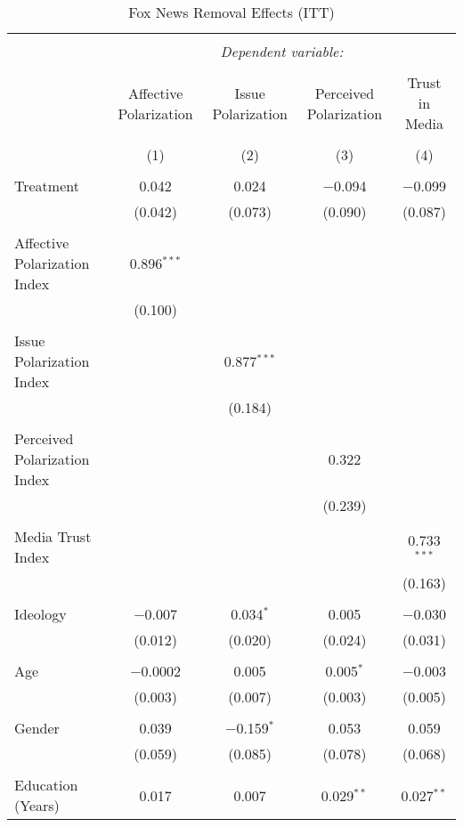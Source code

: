 
\begin{table}[!htbp] \centering 
  \caption{Fox News Removal Effects (ITT)} 
  \label{} 
\tiny 
\begin{tabular}{@{\extracolsep{5pt}}lcccc} 
\\[-1.8ex]\hline 
\hline \\[-1.8ex] 
 & \multicolumn{4}{c}{\textit{Dependent variable:}} \\ 
\cline{2-5} 
\\[-1.8ex] & Affective Polarization & Issue Polarization & Perceived Polarization & Trust in Media \\ 
\\[-1.8ex] & (1) & (2) & (3) & (4)\\ 
\hline \\[-1.8ex] 
 Treatment & 0.042 & 0.024 & $-$0.094 & $-$0.099 \\ 
  & (0.042) & (0.073) & (0.090) & (0.087) \\ 
  & & & & \\ 
 Affective Polarization Index & 0.896$^{***}$ &  &  &  \\ 
  & (0.100) &  &  &  \\ 
  & & & & \\ 
 Issue Polarization Index &  & 0.877$^{***}$ &  &  \\ 
  &  & (0.184) &  &  \\ 
  & & & & \\ 
 Perceived Polarization Index &  &  & 0.322 &  \\ 
  &  &  & (0.239) &  \\ 
  & & & & \\ 
 Media Trust Index &  &  &  & 0.733$^{***}$ \\ 
  &  &  &  & (0.163) \\ 
  & & & & \\ 
 Ideology & $-$0.007 & 0.034$^{*}$ & 0.005 & $-$0.030 \\ 
  & (0.012) & (0.020) & (0.024) & (0.031) \\ 
  & & & & \\ 
 Age & $-$0.0002 & 0.005 & 0.005$^{*}$ & $-$0.003 \\ 
  & (0.003) & (0.007) & (0.003) & (0.005) \\ 
  & & & & \\ 
 Gender & 0.039 & $-$0.159$^{*}$ & 0.053 & 0.059 \\ 
  & (0.059) & (0.085) & (0.078) & (0.068) \\ 
  & & & & \\ 
 Education (Years) & 0.017 & 0.007 & 0.029$^{**}$ & 0.027$^{**}$ \\ 

\end{tabular}
\end{table}

